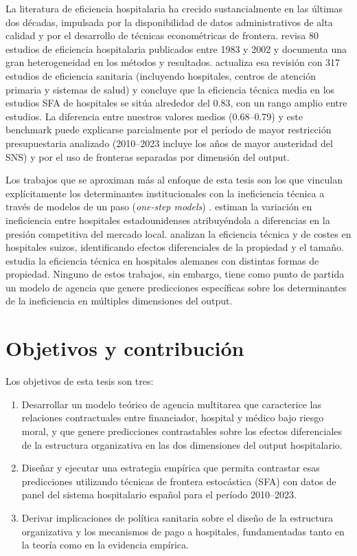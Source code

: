 \documentclass[12pt, a4paper, twoside, openright]{book}
\theoremstyle{plain}
\theoremstyle{definition}
\theoremstyle{remark}
\begin{document}
La literatura de eficiencia hospitalaria ha crecido sustancialmente en las últimas dos décadas, impulsada por la disponibilidad de datos administrativos de alta calidad y por el desarrollo de técnicas econométricas de frontera. \citet{worthington2004} revisa 80 estudios de eficiencia hospitalaria publicados entre 1983 y 2002 y documenta una gran heterogeneidad en los métodos y resultados. \citet{hollingsworth2008} actualiza esa revisión con 317 estudios de eficiencia sanitaria (incluyendo hospitales, centros de atención primaria y sistemas de salud) y concluye que la eficiencia técnica media en los estudios SFA de hospitales se sitúa alrededor del 0.83, con un rango amplio entre estudios. La diferencia entre nuestros valores medios (0.68--0.79) y este benchmark puede explicarse parcialmente por el período de mayor restricción presupuestaria analizado (2010--2023 incluye los años de mayor austeridad del SNS) y por el uso de fronteras separadas por dimensión del output.

Los trabajos que se aproximan más al enfoque de esta tesis son los que vinculan explícitamente los determinantes institucionales con la ineficiencia técnica a través de modelos de un paso (\textit{one-step models}) \citep{battese1995,wang2002}. \citet{burgess1998} estiman la variación en ineficiencia entre hospitales estadounidenses atribuyéndola a diferencias en la presión competitiva del mercado local. \citet{farsi2005} analizan la eficiencia técnica y de costes en hospitales suizos, identificando efectos diferenciales de la propiedad y el tamaño. \citet{herr2011} estudia la eficiencia técnica en hospitales alemanes con distintas formas de propiedad. Ninguno de estos trabajos, sin embargo, tiene como punto de partida un modelo de agencia que genere predicciones específicas sobre los determinantes de la ineficiencia en múltiples dimensiones del output.

\section{Objetivos y contribución}

Los objetivos de esta tesis son tres:

\begin{enumerate}[label=(\roman*)]
  \item Desarrollar un modelo teórico de agencia multitarea que caracterice las relaciones contractuales entre financiador, hospital y médico bajo riesgo moral, y que genere predicciones contrastables sobre los efectos diferenciales de la estructura organizativa en las dos dimensiones del output hospitalario.

  \item Diseñar y ejecutar una estrategia empírica que permita contrastar esas predicciones utilizando técnicas de frontera estocástica (SFA) con datos de panel del sistema hospitalario español para el período 2010--2023.

  \item Derivar implicaciones de política sanitaria sobre el diseño de la estructura organizativa y los mecanismos de pago a hospitales, fundamentadas tanto en la teoría como en la evidencia empírica.
\end{enumerate}
\end{document}

